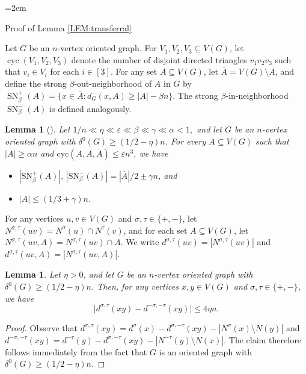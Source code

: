 \documentclass[11pt,a4paper,reqno]{amsart}
\makeatletter
\renewcommand\subsection{\@startsection{subsection}{2}%
  \z@{-1\linespacing\@plus-.7\linespacing}{1\linespacing}%
  {\normalfont\large\bfseries\raggedright\hangindent=2em  \hangafter=1}}
\newtheorem{lemma}[theorem]{Lemma}
\theoremstyle{definition} %
\makeatother
\begin{document}
\subsection{Proof of Lemma \ref{LEM:transferral}}

Let $G$ be an $n$-vertex oriented graph. For  $V_1,V_2,V_3\subseteq V(G)$, let $\operatorname{cyc}(V_1,V_2,V_3)$ denote the  number of disjoint directed triangles $v_1v_2v_3$ such that $v_i\in V_i$ for each $i\in[3]$. For any set $A\subseteq V(G)$, let $\overline{A}=V(G)\setminus A$, and define the strong $\beta$-out-neighborhood of $A$ in $G$ by $\operatorname{SN}_{\beta}^+(A)=\{x\in \overline{A}: d_G^-(x,A)\geqslant |A|-\beta n\}$. 
The strong $\beta$-in-neighborhood $\operatorname{SN}_{\beta}^-(A)$ is defined analogously.


\begin{lemma}[\cite{liEJC26}]\label{LEM:divide lemma}
Let $1/n \ll \eta \ll \varepsilon \ll \beta \ll \gamma \ll \alpha < 1,$
and let $G$ be an $n$-vertex oriented graph with  $\delta^0(G) \geqslant(1/2- \eta)n$. For every $A\subseteq V(G)$ such that $|A|\geqslant \alpha n$ and $\mathrm{cyc}(A,A,\overline{A}) \leqslant \varepsilon n^3$, we have 
\begin{itemize}
    \item $|\text{SN}^+_\beta(A)|,\, |\text{SN}^-_\beta(A)| = |\overline{A}|/2 \pm \gamma n$, and
    \item $|A| \leqslant \left(1/3 + \gamma\right)n$.
\end{itemize}
\end{lemma}

For any vertices $u,v\in V(G)$ and $\sigma,\tau\in\{+,-\}$, let $N^{\sigma,\tau}(uv)=N^\sigma(u)\cap N^\tau(v)$, and for each set $A\subseteq V(G)$, let $N^{\sigma,\tau}(uv,A)=N^{\sigma,\tau}(uv)\cap A$. We write $d^{\sigma,\tau}(uv)=|N^{\sigma,\tau}(uv)|$ and $d^{\sigma,\tau}(uv,A)=|N^{\sigma,\tau}(uv,A)|$.


\begin{lemma}\label{LEM:-+=+-}
    Let $\eta>0$, and let $G$ be an $n$-vertex oriented graph with $\delta^0(G)\geqslant(1/2-\eta)n$. Then, for any vertices $x,y\in V(G)$ and  $\sigma,\tau\in\{+,-\}$, we have
$$
\bigl|d^{\sigma,\tau}(xy)-d^{-\sigma,-\tau}(xy)\bigr|\leqslant 4\eta n.
$$
\end{lemma}
    \begin{proof} Observe that $d^{\sigma,\tau}(xy)=d^\sigma(x)-d^{\sigma,-\tau}(xy)-|N^\sigma(x)\setminus N(y)|$ and $d^{-\sigma,-\tau}(xy)=d^{-\tau}(y)-d^{\sigma,-\tau}(xy)-|N^{-\tau}(y)\setminus N(x)|$. The claim therefore follows immediately from the fact that $G$ is an oriented graph with $\delta^0(G)\geqslant(1/2-\eta)n$.
    \end{proof}
\end{document}
